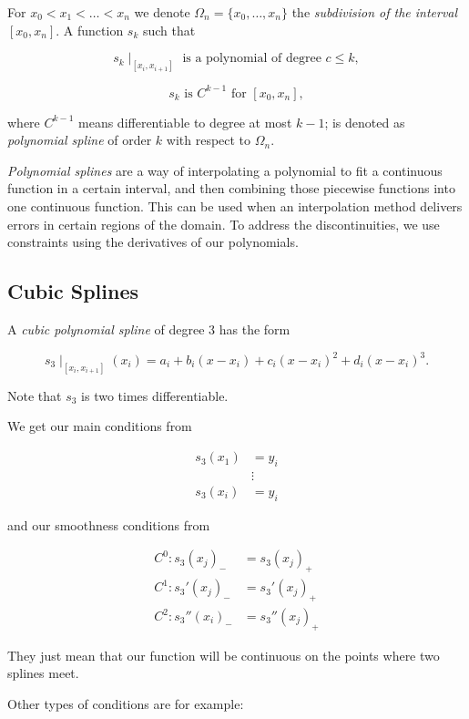 For \(x_0 < x_1 < \dots < x_n\) we denote \(\Omega_n = \{x_0, \dots, x_n\}\) the \emph{subdivision of the interval} \([x_0, x_n]\). A function 
\(s_k\) such that 

\[
    s_k \mid_{[x_i, x_{i + 1}]} \text{ is a polynomial of degree } c \le k,
\]

\[
    s_k \text{ is } C^{k - 1} \text{ for } [x_0, x_n],
\]

where \(C^{k - 1}\) means differentiable to degree at most \(k - 1\); is denoted as \emph{polynomial spline} of order \(k\) with respect to \(\Omega_n\).

\emph{Polynomial splines} are a way of interpolating a polynomial to fit a continuous function in a certain interval, 
and then combining those piecewise functions into one continuous function. This can be used when an interpolation method delivers 
errors in certain regions of the domain. To address the discontinuities, we use constraints using the derivatives of our polynomials.

\subsection{Cubic Splines}

A \emph{cubic polynomial spline} of degree 3 has the form 

\[
    s_3 \mid_{[x_i, x_{i + 1}]}(x_i) =  a_i + b_i (x  - x_i) + c_i (x  - x_i)^2 +d_i (x  - x_i)^3.
\]

Note that \(s_3\) is two times differentiable. 

We get our main conditions from 

\begin{align*}
    s_3(x_1) &= y_i \\ 
    &\vdots \\ 
    s_3(x_i) &= y_i
\end{align*}

and our smoothness conditions from 

\begin{align*}
    C^0: s_3(x_j)_- &= s_3(x_j)_+ \\ 
    C^1: s_3'(x_j)_- &= s_3'(x_j)_+ \\ 
    C^2: s_3''(x_i)_- &= s_3''(x_j)_+ 
\end{align*}

They just mean that our function will be continuous on the points where two splines meet.

Other types of conditions are for example: 

